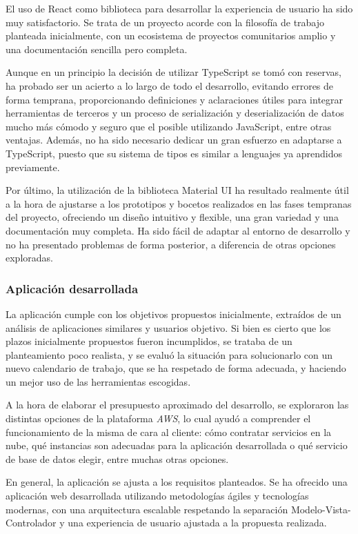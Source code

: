 \documentclass[10pt, a4paper]{aqademic}
\begin{document}
El uso de React como biblioteca para desarrollar la experiencia de usuario ha sido muy satisfactorio. Se trata de un proyecto acorde con la filosofía de trabajo planteada inicialmente, con un ecosistema de proyectos comunitarios amplio y una documentación sencilla pero completa.

Aunque en un principio la decisión de utilizar TypeScript se tomó con reservas, ha probado ser un acierto a lo largo de todo el desarrollo, evitando errores de forma temprana, proporcionando definiciones y aclaraciones útiles para integrar herramientas de terceros y un proceso de serialización y deserialización de datos mucho más cómodo y seguro que el posible utilizando JavaScript, entre otras ventajas. Además, no ha sido necesario dedicar un gran esfuerzo en adaptarse a TypeScript, puesto que su sistema de tipos es similar a lenguajes ya aprendidos previamente. 

Por último, la utilización de la biblioteca Material UI ha resultado realmente útil a la hora de ajustarse a los prototipos y bocetos realizados en las fases tempranas del proyecto, ofreciendo un diseño intuitivo y flexible, una gran variedad y una documentación muy completa. Ha sido fácil de adaptar al entorno de desarrollo y no ha presentado problemas de forma posterior, a diferencia de otras opciones exploradas.


\subsubsection{Aplicación desarrollada}

La aplicación cumple con los objetivos propuestos inicialmente, extraídos de un análisis de aplicaciones similares y usuarios objetivo. Si bien es cierto que los plazos inicialmente propuestos fueron incumplidos, se trataba de un planteamiento poco realista, y se evaluó la situación para solucionarlo con un nuevo calendario de trabajo, que se ha respetado de forma adecuada, y haciendo un mejor uso de las herramientas escogidas.

A la hora de elaborar el presupuesto aproximado del desarrollo, se exploraron las distintas opciones de la plataforma \textit{AWS}, lo cual ayudó a comprender el funcionamiento de la misma de cara al cliente: cómo contratar servicios en la nube, qué instancias son adecuadas para la aplicación desarrollada o qué servicio de base de datos elegir, entre muchas otras opciones.

En general, la aplicación se ajusta a los requisitos planteados. Se ha ofrecido una aplicación web desarrollada utilizando metodologías ágiles y tecnologías modernas, con una arquitectura escalable respetando la separación Modelo-Vista-Controlador y una experiencia de usuario ajustada a la propuesta realizada.
\end{document}
